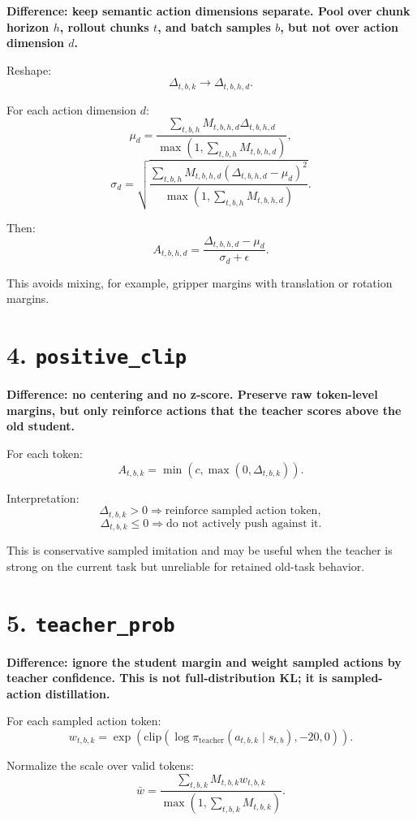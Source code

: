 \documentclass[10pt]{article}
\newcommand{\Diff}[1]{\textcolor{DiffBlue}{\textbf{#1}}}
\newcommand{\code}[1]{\texttt{#1}}
\newcommand{\Margin}{\Delta}
\newcommand{\Mask}{M}
\newcommand{\Adv}{A}
\begin{document}
\Diff{Difference: keep semantic action dimensions separate. Pool over chunk horizon
$h$, rollout chunks $t$, and batch samples $b$, but not over action dimension $d$.}

Reshape:
\[
  \Margin_{t,b,k}
  \rightarrow
  \Margin_{t,b,h,d}.
\]

For each action dimension $d$:
\[
  \mu_d
  =
  \frac{\sum_{t,b,h}\Mask_{t,b,h,d}\Margin_{t,b,h,d}}
       {\max\left(1,\sum_{t,b,h}\Mask_{t,b,h,d}\right)},
\]
\[
  \sigma_d
  =
  \sqrt{
    \frac{\sum_{t,b,h}\Mask_{t,b,h,d}(\Margin_{t,b,h,d}-\mu_d)^2}
         {\max\left(1,\sum_{t,b,h}\Mask_{t,b,h,d}\right)}
  }.
\]

Then:
\[
  \Adv_{t,b,h,d}
  =
  \frac{\Margin_{t,b,h,d}-\mu_d}{\sigma_d+\epsilon}.
\]

This avoids mixing, for example, gripper margins with translation or rotation margins.

\section*{4. \code{positive\_clip}}

\Diff{Difference: no centering and no z-score. Preserve raw token-level margins, but
only reinforce actions that the teacher scores above the old student.}

For each token:
\[
  \Adv_{t,b,k}
  =
  \min\left(c,\max\left(0,\Margin_{t,b,k}\right)\right).
\]

Interpretation:
\[
  \Margin_{t,b,k} > 0
  \Rightarrow
  \text{reinforce sampled action token},
\]
\[
  \Margin_{t,b,k} \le 0
  \Rightarrow
  \text{do not actively push against it}.
\]

This is conservative sampled imitation and may be useful when the teacher is strong on
the current task but unreliable for retained old-task behavior.

\section*{5. \code{teacher\_prob}}

\Diff{Difference: ignore the student margin and weight sampled actions by teacher
confidence. This is not full-distribution KL; it is sampled-action distillation.}

For each sampled action token:
\[
  w_{t,b,k}
  =
  \exp\left(
    \mathrm{clip}\left(
      \log \pi_{\mathrm{teacher}}(a_{t,b,k}\mid s_{t,b}),
      -20,
      0
    \right)
  \right).
\]

Normalize the scale over valid tokens:
\[
  \bar{w}
  =
  \frac{\sum_{t,b,k}\Mask_{t,b,k}w_{t,b,k}}
       {\max\left(1,\sum_{t,b,k}\Mask_{t,b,k}\right)}.
\]
\end{document}
